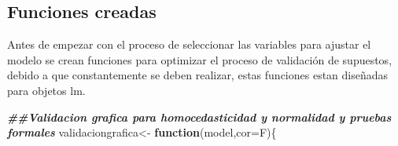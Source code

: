 \documentclass[
]{article}
\newenvironment{Shaded}{\begin{snugshade}}{\end{snugshade}}
\newcommand{\AttributeTok}[1]{\textcolor[rgb]{0.77,0.63,0.00}{#1}}
\newcommand{\ControlFlowTok}[1]{\textcolor[rgb]{0.13,0.29,0.53}{\textbf{#1}}}
\newcommand{\DocumentationTok}[1]{\textcolor[rgb]{0.56,0.35,0.01}{\textbf{\textit{#1}}}}
\newcommand{\NormalTok}[1]{#1}
\newcommand{\OtherTok}[1]{\textcolor[rgb]{0.56,0.35,0.01}{#1}}
\begin{document}
\hypertarget{funciones-creadas}{%
\subsection{Funciones creadas}\label{funciones-creadas}}

Antes de empezar con el proceso de seleccionar las variables para
ajustar el modelo se crean funciones para optimizar el proceso de
validación de supuestos, debido a que constantemente se deben realizar,
estas funciones estan diseñadas para objetos lm.

\begin{Shaded}
\begin{Highlighting}[]
\DocumentationTok{\#\#Validacion grafica para homocedasticidad y normalidad y pruebas formales}
\NormalTok{validaciongrafica}\OtherTok{\textless{}{-}} \ControlFlowTok{function}\NormalTok{(model,}\AttributeTok{cor=}\NormalTok{F)\{}
  

\end{Highlighting}
\end{Shaded}
\end{document}
